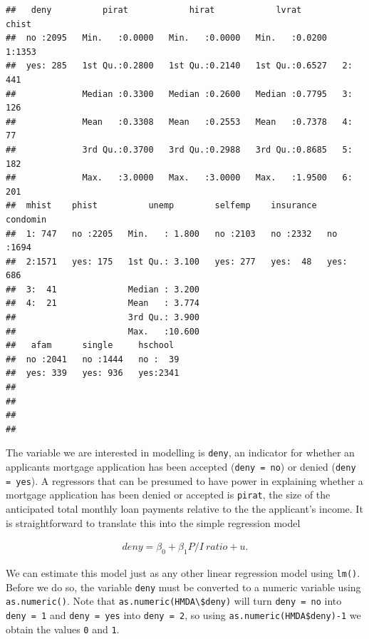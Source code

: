 \documentclass[]{book}
\theoremstyle{definition}
\theoremstyle{definition}
\theoremstyle{definition}
\theoremstyle{remark}
\begin{document}
\begin{verbatim}
##   deny          pirat            hirat            lvrat        chist   
##  no :2095   Min.   :0.0000   Min.   :0.0000   Min.   :0.0200   1:1353  
##  yes: 285   1st Qu.:0.2800   1st Qu.:0.2140   1st Qu.:0.6527   2: 441  
##             Median :0.3300   Median :0.2600   Median :0.7795   3: 126  
##             Mean   :0.3308   Mean   :0.2553   Mean   :0.7378   4:  77  
##             3rd Qu.:0.3700   3rd Qu.:0.2988   3rd Qu.:0.8685   5: 182  
##             Max.   :3.0000   Max.   :3.0000   Max.   :1.9500   6: 201  
##  mhist    phist          unemp        selfemp    insurance  condomin  
##  1: 747   no :2205   Min.   : 1.800   no :2103   no :2332   no :1694  
##  2:1571   yes: 175   1st Qu.: 3.100   yes: 277   yes:  48   yes: 686  
##  3:  41              Median : 3.200                                   
##  4:  21              Mean   : 3.774                                   
##                      3rd Qu.: 3.900                                   
##                      Max.   :10.600                                   
##   afam      single     hschool   
##  no :2041   no :1444   no :  39  
##  yes: 339   yes: 936   yes:2341  
##                                  
##                                  
##                                  
## 
\end{verbatim}

The variable we are interested in modelling is \texttt{deny}, an
indicator for whether an applicants mortgage application has been
accepted (\texttt{deny = no}) or denied (\texttt{deny = yes}). A
regressors that can be presumed to have power in explaining whether a
mortgage application has been denied or accepted is \texttt{pirat}, the
size of the anticipated total monthly loan payments relative to the the
applicant's income. It is straightforward to translate this into the
simple regression model

\begin{align}
  deny = \beta_0 + \beta_1 P/I\ ratio + u. \label{eq:denymod1}
\end{align}

We can estimate this model just as any other linear regression model
using \texttt{lm()}. Before we do so, the variable \texttt{deny} must be
converted to a numeric variable using \texttt{as.numeric()}. Note that
\texttt{as.numeric(HMDA\textbackslash{}\$deny)} will turn
\texttt{deny = no} into \texttt{deny = 1} and \texttt{deny = yes} into
\texttt{deny = 2}, so using \texttt{as.numeric(HMDA\$deny)-1} we obtain
the values \texttt{0} and \texttt{1}.
\end{document}

